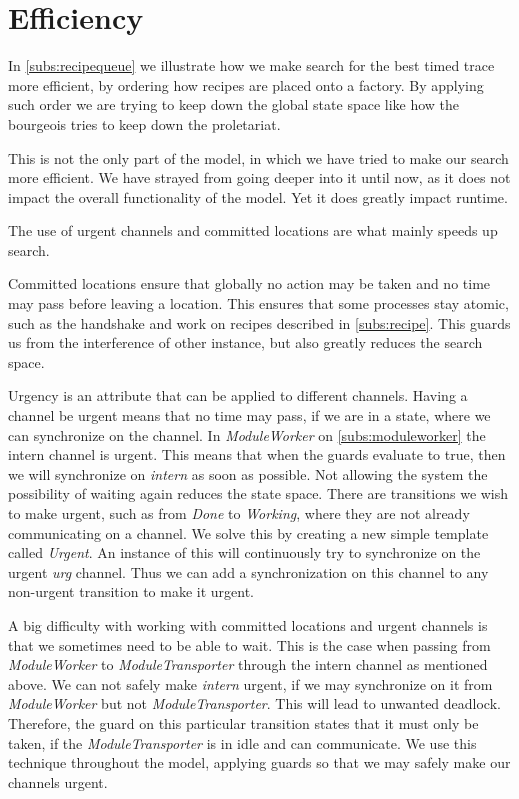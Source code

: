 \section{Efficiency}\label{subs:efficiency}
In \cref{subs:recipequeue} we illustrate how we make search for the best timed trace more efficient, by ordering how recipes are placed onto a factory. By applying such order we are trying to keep down the global state space like how the bourgeois tries to keep down the proletariat.   

This is not the only part of the model, in which we have tried to make our search more efficient. We have strayed from going deeper into it until now, as it does not impact the overall functionality of the model. Yet it does greatly impact runtime. 

The use of urgent channels and committed locations are what mainly speeds up search.

Committed locations ensure that globally no action may be taken and no time may pass before leaving a location. This ensures that some processes stay atomic, such as the handshake and work on recipes described in \cref{subs:recipe}. This guards us from the interference of other instance, but also greatly reduces the search space.

Urgency is an attribute that can be applied to different channels. Having a channel be urgent means that no time may pass, if we are in a state, where we can synchronize on the channel. In \emph{ModuleWorker} on \cref{subs:moduleworker} the intern channel is urgent. This means that when the guards evaluate to true, then we will synchronize on \emph{intern} as soon as possible. Not allowing the system the possibility of waiting again reduces the state space. There are transitions we wish to make urgent, such as from \emph{Done} to \emph{Working}, where they are not already communicating on a channel. We solve this by creating a new simple template called \emph{Urgent}. An instance of this will continuously try to synchronize on the urgent \emph{urg} channel. Thus we can add a synchronization on this channel to any non-urgent transition to make it urgent. 

A big difficulty with working with committed locations and urgent channels is that we sometimes need to be able to wait. This is the case when passing from \emph{ModuleWorker} to \emph{ModuleTransporter} through the intern channel as mentioned above. We can not safely make \emph{intern} urgent, if we may synchronize on it from \emph{ModuleWorker} but not   \emph{ModuleTransporter}. This will lead to unwanted deadlock.  Therefore, the guard on this particular transition states that it must only be taken, if the \emph{ModuleTransporter} is in idle and can communicate. We use this technique throughout the model, applying guards so that we may safely make our channels urgent. 

